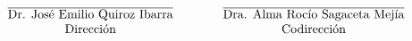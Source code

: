 \[\begin{matrix}\centering
&&\\
\overline{\text{Dr. José Emilio Quiroz Ibarra}}&\qquad&\overline{\text{Dra. Alma Rocío Sagaceta Mejía}}\\
\text{Dirección}&\qquad&\text{Codirección}
\end{matrix}\]